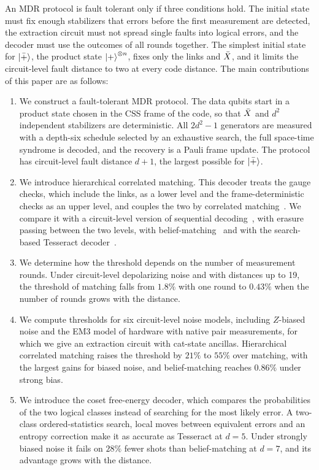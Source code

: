 An MDR protocol is fault tolerant only if three conditions hold. The initial state must fix enough stabilizers that errors before the first measurement are detected, the extraction circuit must not spread single faults into logical errors, and the decoder must use the outcomes of all rounds together. The simplest initial state for $\left|\bar{+}\right\rangle$, the product state $\left|+\right\rangle^{\otimes n}$, fixes only the links and $\bar{X}$, and it limits the circuit-level fault distance to two at every code distance. The main contributions of this paper are as follows:
\begin{enumerate}
  \item We construct a fault-tolerant MDR protocol. The data qubits start in a product state chosen in the CSS frame of the code, so that $\bar{X}$ and $d^2$ independent stabilizers are deterministic. All $2d^2-1$ generators are measured with a depth-six schedule selected by an exhaustive search, the full space-time syndrome is decoded, and the recovery is a Pauli frame update. The protocol has circuit-level fault distance $d+1$, the largest possible for $\left|\bar{+}\right\rangle$.
  \item We introduce hierarchical correlated matching. This decoder treats the gauge checks, which include the links, as a lower level and the frame-deterministic checks as an upper level, and couples the two by correlated matching~\cite{fowler2013}. We compare it with a circuit-level version of sequential decoding~\cite{Sri2025}, with erasure passing between the two levels, with belief-matching~\cite{higgott2023} and with the search-based Tesseract decoder~\cite{beni2025}.
  \item We determine how the threshold depends on the number of measurement rounds. Under circuit-level depolarizing noise and with distances up to 19, the threshold of matching falls from $1.8\%$ with one round to $0.43\%$ when the number of rounds grows with the distance.
  \item We compute thresholds for six circuit-level noise models, including $Z$-biased noise and the EM3 model of hardware with native pair measurements, for which we give an extraction circuit with cat-state ancillas. Hierarchical correlated matching raises the threshold by $21\%$ to $55\%$ over matching, with the largest gains for biased noise, and belief-matching reaches $0.86\%$ under strong bias.
  \item We introduce the coset free-energy decoder, which compares the probabilities of the two logical classes instead of searching for the most likely error. A two-class ordered-statistics search, local moves between equivalent errors and an entropy correction make it as accurate as Tesseract at $d=5$. Under strongly biased noise it fails on $28\%$ fewer shots than belief-matching at $d=7$, and its advantage grows with the distance.

\end{enumerate}
